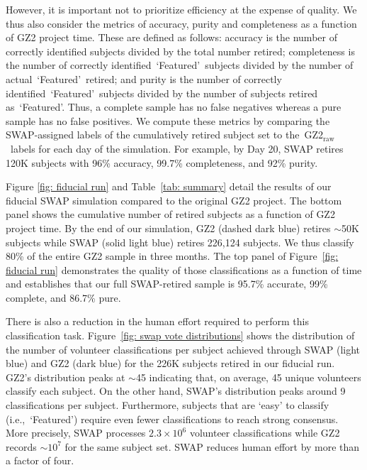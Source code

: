 \documentclass[twocolumn, trackchanges, linenumbers]{aastex6}%
\newcommand{\feat}{`Featured'}
\newcommand{\raw}{GZ2$_{\text{raw}}$}
\begin{document}
However, it is important not to prioritize efficiency at the expense of quality. 
We thus also consider the metrics of accuracy, 
purity and completeness as a function of GZ2 project time.  
These are defined as follows: accuracy is the number of correctly
identified subjects divided by the total number retired; completeness is the number of 
correctly identified~\feat~subjects divided by the number of actual~\feat~retired; 
and purity is the number of correctly identified~\feat~subjects divided by 
the number of subjects retired as~\feat. Thus, a complete sample has no false
negatives whereas a pure sample has no false positives. 
We compute these metrics by comparing the SWAP-assigned labels of the cumulatively 
retired subject set to the~\raw~labels for each day of the simulation. 
For example, by Day 20, SWAP retires 120K subjects with 96\% accuracy,
 99.7\% completeness, and 92\% purity. 

Figure \ref{fig: fiducial run} and Table~\ref{tab: summary} detail the results of 
our fiducial SWAP simulation compared to the original GZ2 project. 
The bottom panel shows the cumulative number of retired subjects as a function of 
GZ2 project time. By the end of our simulation, GZ2 (dashed dark blue)
 retires $\sim$50K subjects while SWAP (solid light blue) retires 226,124 subjects.  
We thus classify 80\% of the entire GZ2 sample in three months. 
The top panel of Figure~\ref{fig: fiducial run} demonstrates the quality of 
those classifications as a function of time and establishes that our full 
SWAP-retired sample is 95.7\% accurate, 99\% complete, and 86.7\% pure. 



There is also a reduction in the human effort required to perform this classification task.
  Figure~\ref{fig: swap vote distributions} shows the distribution of the number 
of volunteer classifications per subject achieved through SWAP (light blue) 
and GZ2 (dark blue) for the 226K subjects retired in our fiducial run. 
GZ2's distribution peaks at $\sim$45 indicating that, on average,
45 unique volunteers classify each subject. On the other hand, SWAP's
distribution peaks around 9 classifications per subject. 
Furthermore, subjects that are `easy' to classify (i.e.,~\feat) require
even fewer classifications to reach strong consensus. 
More precisely, SWAP processes $2.3 \times 10^6$ volunteer 
classifications while GZ2 records $\sim$$10^7$ for the same subject set. 
SWAP reduces human effort by more than a factor of four. 
\end{document}
